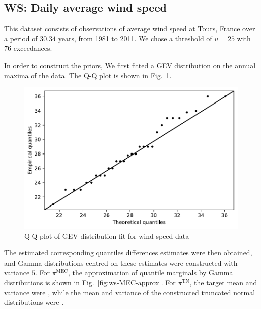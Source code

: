 \documentclass{article}
\begin{document}
\subsection{WS: Daily average wind speed}
%

%
This dataset consists of observations of average wind speed
at Tours, France over a period of $30.34$ years, from 1981 to 2011.
We chose a threshold of $u = 25$ with $76$ exceedances.
%

%
In order to construct the priors,
We first fitted a GEV distribution on the annual maxima of the data.
The Q-Q plot is shown in Fig.~\ref{fig:ws-qq}.
%
\begin{figure}
	\centering
	\includegraphics[width=0.7\linewidth]{plots/ws-qq.pdf}
	\caption{Q-Q plot of GEV distribution fit for wind speed data}
	\label{fig:ws-qq}
\end{figure}
%
The estimated corresponding quantiles differences estimates
were then obtained, and Gamma distributions centred on these estimates
were constructed with variance $5$.
For $\pi^{\text{MEC}}$, the approximation of quantile marginals
by Gamma distributions is shown in Fig.~\ref{fig:ws-MEC-approx}.
For $\pi^{\text{TN}}$, the target mean and variance were
,
while the mean and variance of the constructed
truncated normal distributions were
.
%
\end{document}
